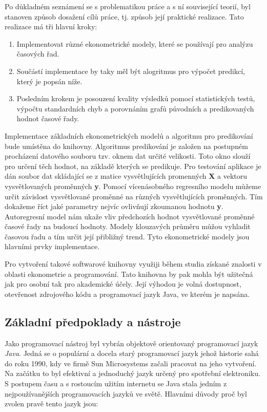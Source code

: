 \documentclass[a4paper,12pt,twoside]{scrreprt}
\begin{document}
Po důkladném seznámení se s problematikou práce a s ní související teorií, byl stanoven způsob dosažení cílů práce, tj. způsob její praktické realizace. Tato realizace má tři hlavní kroky:

\begin{enumerate}
\item Implementovat různé ekonometrické modely, které se používají pro analýzu časových řad.

\item Součástí implementace by taky měl být alogritmus pro výpočet predikcí, který je popsán níže. 

\item Posledním krokem je posouzení kvality výsledků pomocí statistických testů, výpočtu standardních chyb a porovnáním grafů původních a predikovaných hodnot časové řady.	
\end{enumerate}
 
Implementace základních ekonometrických modelů a algoritmu pro predikování bude umístěna do knihovny. Algoritmus predikování je založen na postupném procházení datového souboru tzv. oknem dat určité velikosti. Toto okno slouží pro určení těch hodnot, na základě kterých se predikuje. Pro testování aplikace je dán soubor dat skládající se z matice vysvětlujících promenných \textbf{X} a vektoru vysvětlovaných proměnných \textbf{y}. Pomocí vícenásobného regresního modelu můžeme určit závislost vysvětlované proměnné na různých vysvětlujících proměnných. Tím dokažeme říct jaké parametry nejvíc ovlivňují zkoumanou hodnotu \textbf{y}. Autoregresní model nám ukaže vliv předchozích hodnot vysvětlované proměnné časové řady na budoucí hodnoty. Modely klouzavých průměru můžou vyhladit časovou řadu a tím určit její přibližný trend. Tyto ekonometrické modely jsou hlavními prvky implementace.

Pro vytvoření takové softwarové knihovny využiji během studia získané znalosti v oblasti ekonometrie a programování. Tato knihovna by pak mohla být užitečná jak pro osobní tak pro akademické účely. Její výhodou je volná dostupnost, otevřenost zdrojového kódu a programovací jazyk Java, ve kterém je napsána. 

\subsection{Základní předpoklady a nástroje}

Jako programovací nástroj byl vybrán objektově orientovaný programovací jazyk \textit{Java}. Jedná se o populární a docela starý programovací jazyk jehož historie sahá do roku 1990, kdy ve firmě Sun Microsystems začali pracovat na jeho vytvoření. Na začátku to byl efektivní a jednoduchý jazyk určený pro spotřební elektroniku. S postupem času a s rostoucím užitím internetu se Java stala jedním z nejpoužívanějších programovacích jazyků ve světě. Hlavními důvody proč byl zvolen pravě tento jazyk jsou: 
\end{document}
